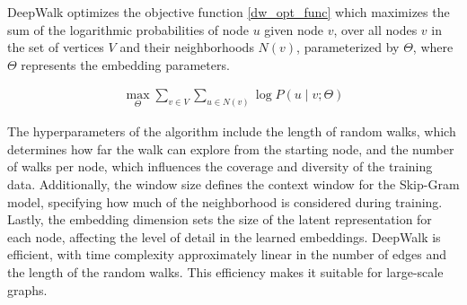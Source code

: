\clearpage

DeepWalk optimizes the objective function \ref{dw_opt_func} 
which maximizes the sum of the logarithmic probabilities of node $u$ given node $v$, over all nodes $v$ in the set of vertices $V$ and their neighborhoods ${N(v)}$, parameterized by $\Theta$,
where  $\Theta$ represents the embedding parameters.


\begin{align}
\label{dw_opt_func}
\max_{\Theta} \sum_{v \in V} \sum_{u \in N(v)} \log P(u \mid v; \Theta)
\end{align}

The hyperparameters of the algorithm include the length of random walks, which determines how far the walk can explore from the starting node, and the number of walks per node, which influences the coverage and diversity of the training data. Additionally, the window size defines the context window for the Skip-Gram model, specifying how much of the neighborhood is considered during training. Lastly, the embedding dimension sets the size of the latent representation for each node, affecting the level of detail in the learned embeddings. DeepWalk is efficient, with time complexity approximately linear in the number of edges and the length of the random walks. This efficiency makes it suitable for large-scale graphs.

